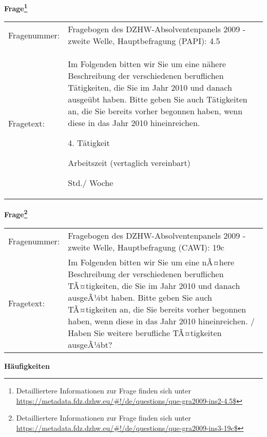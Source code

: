 				\vspace*{0.5cm}
                \noindent\textbf{Frage\footnote{Detailliertere Informationen zur Frage finden sich unter
		              \url{https://metadata.fdz.dzhw.eu/\#!/de/questions/que-gra2009-ins2-4.5$}}}\\
				\begin{tabularx}{\hsize}{@{}lX}
					Fragenummer: &
					  Fragebogen des DZHW-Absolventenpanels 2009 - zweite Welle, Hauptbefragung (PAPI):
					  4.5
 \\
					Fragetext: & Im Folgenden bitten wir Sie um eine nähere Beschreibung der verschiedenen beruflichen Tätigkeiten, die Sie im Jahr 2010 und danach ausgeübt haben. Bitte geben Sie auch Tätigkeiten an, die Sie bereits vorher begonnen haben, wenn diese in das Jahr 2010 hineinreichen.\par  4. Tätigkeit\par  Arbeitszeit (vertaglich vereinbart)\par  Std./ Woche \\
				\end{tabularx}
				\vspace*{0.5cm}
                \noindent\textbf{Frage\footnote{Detailliertere Informationen zur Frage finden sich unter
		              \url{https://metadata.fdz.dzhw.eu/\#!/de/questions/que-gra2009-ins3-19c$}}}\\
				\begin{tabularx}{\hsize}{@{}lX}
					Fragenummer: &
					  Fragebogen des DZHW-Absolventenpanels 2009 - zweite Welle, Hauptbefragung (CAWI):
					  19c
 \\
					Fragetext: & Im Folgenden bitten wir Sie um eine nÃ¤here Beschreibung der verschiedenen beruflichen TÃ¤tigkeiten, die Sie im Jahr 2010 und danach ausgeÃ¼bt haben. Bitte geben Sie auch TÃ¤tigkeiten an, die Sie bereits vorher begonnen haben, wenn diese in das Jahr 2010 hineinreichen. / Haben Sie weitere berufliche TÃ¤tigkeiten ausgeÃ¼bt? \\
				\end{tabularx}





        		\vspace*{0.5cm}
                \noindent\textbf{Häufigkeiten}


